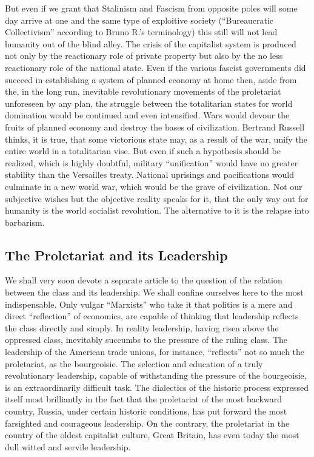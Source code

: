 But even if we grant that Stalinism and Fascism from opposite poles will some day arrive at one and the same type of exploitive society (“Bureaucratic Collectivism” according to Bruno R.’s terminology) this still will not lead humanity out of the blind alley. The crisis of the capitalist system is produced not only by the reactionary role of private property but also by the no less reactionary role of the national state. Even if the various fascist governments did succeed in establishing a system of planned economy at home then, aside from the, in the long run, inevitable revolutionary movements of the proletariat unforeseen by any plan, the struggle between the totalitarian states for world domination would be continued and even intensified. Wars would devour the fruits of planned economy and destroy the bases of civilization. Bertrand Russell thinks, it is true, that some victorious state may, as a result of the war, unify the entire world in a totalitarian vise. But even if such a hypothesis should be realized, which is highly doubtful, military “unification” would have no greater stability than the Versailles treaty. National uprisings and pacifications would culminate in a new world war, which would be the grave of civilization. Not our subjective wishes but the objective reality speaks for it, that the only way out for humanity is the world socialist revolution. The alternative to it is the relapse into barbarism.

\subsection*{The Proletariat and its Leadership}

We shall very soon devote a separate article to the question of the relation between the class and its leadership. We shall confine ourselves here to the most indispensable. Only vulgar “Marxists” who take it that politics is a mere and direct “reflection” of economics, are capable of thinking that leadership reflects the class directly and simply. In reality leadership, having risen above the oppressed class, inevitably succumbs to the pressure of the ruling class. The leadership of the American trade unions, for instance, “reflects” not so much the proletariat, as the bourgeoisie. The selection and education of a truly revolutionary leadership, capable of withstanding the pressure of the bourgeoisie, is an extraordinarily difficult task. The dialectics of the historic process expressed itself most brilliantly in the fact that the proletariat of the most backward country, Russia, under certain historic conditions, has put forward the most farsighted and courageous leadership. On the contrary, the proletariat in the country of the oldest capitalist culture, Great Britain, has even today the most dull witted and servile leadership.

